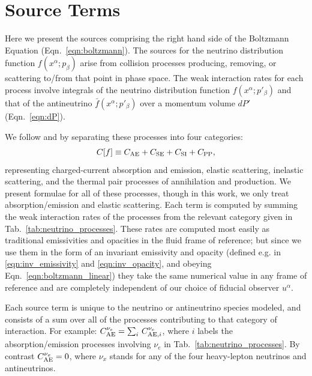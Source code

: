 \documentclass[aps,floatfix,prd,superscriptaddress,twocolumn]{revtex4-1}
\newcommand{\todo}[1]{\marginpar{\tiny{\textcolor{red}{#1}}}}
\begin{document}
\appendix

\section{Source Terms}
\label{sec:source_terms}
Here we present the sources comprising the right hand side of the
Boltzmann Equation (Eqn.~\ref{eqn:boltzmann}). The sources for the neutrino
distribution function $f(x^\alpha;p_\beta)$ arise from collision processes
producing, removing, or scattering to/from that point in phase space.
The weak interaction rates for each process involve integrals of
the neutrino distribution function $f(x^\alpha;p'_\beta)$ and that of the
antineutrino $\bar{f}(x^\alpha;p'_\beta)$ over a momentum volume
$dP'$ (Eqn.~\ref{eqn:dP}).

We follow
\cite{brue1985-core_collapse} and \cite[Sec.~4]{shib2011-truncated_moment}
by separating these processes into four categories:
\begin{equation}
  \label{eqn:four_sources}
  C[f] \equiv C_{\rm AE} + C_{\rm SE} + C_{\rm SI} + C_{\rm PP},
\end{equation}
representing charged-current absorption and emission, elastic scattering,
inelastic scattering, and the thermal pair processes of annihilation and
production.
We present formulae for all of these processes, though in this work, we only
treat absorption/emission and elastic scattering.
Each term
is computed by summing the weak interaction rates of the processes from the
relevant category given in Tab.~\ref{tab:neutrino_processes}.
These rates are computed most easily as traditional emissivities and opacities
in the fluid frame of reference;
but since we use them in the form of an invariant emissivity and opacity
(defined e.g. in \ref{eqn:inv_emissivity} and \ref{eqn:inv_opacity},
and obeying Eqn.~\ref{eqn:boltzmann_linear})
they take the same numerical value in any frame of reference
and are completely independent of our choice of fiducial observer $u^\alpha$.
\todo{confirm}

Each source term is unique to the neutrino or antineutrino species modeled,
and consists of a sum over all of the processes contributing to that
category of interaction. For example:
$C^{\nu_e}_{{\rm AE}} = \sum_i\,C^{\nu_e}_{{\rm AE},i}$,
where $i$ labels the absorption/emission processes involving $\nu_e$
in Tab.~\ref{tab:neutrino_processes}.
By contrast $C^{\nu_x}_{{\rm AE}} = 0$,
where $\nu_x$ stands for any of the four heavy-lepton neutrinos and
antineutrinos.
\end{document}
